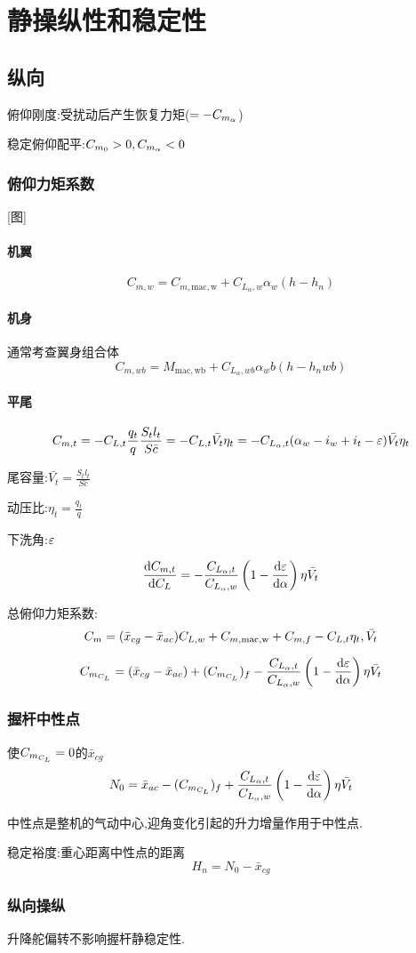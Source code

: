 \chapter{静操纵性和稳定性}

\section{纵向}
俯仰刚度:受扰动后产生恢复力矩($=-{C_{m_\alpha}}$)

稳定俯仰配平:${C_{m_0}} >0 ,{C_{m_\alpha}}<0$

\subsection{俯仰力矩系数}
[图]
\subsubsection{机翼}
$$C_{m,w}=C_{m,\mathrm{mac,w}}+C_{L_\alpha,w} \alpha_w(h-h_n)$$

\subsubsection{机身}
通常考查翼身组合体
$$C_{m,wb}=M_{\mathrm{mac,wb}}+C_{L_\alpha,wb} \alpha_wb(h-h_nwb)$$

\subsubsection{平尾}
$$C_{m,t}=-C_{L,t}\frac{q_t}{q}\frac{S_tl_t}{S\bar{c}}=-C_{L,t}\bar{V_t}\eta_t=-C_{L_{\alpha},t}(\alpha_w-i_w+i_t-{\varepsilon})\bar{V_t}\eta_t$$

尾容量:$\displaystyle\bar{V_t}=\frac{S_tl_t}{S\bar{c}}$

动压比:$\displaystyle\eta_t=\frac{q_t}{q}$

下洗角:${\varepsilon}$

$$\frac{\operatorname{d\!} C_{m,t}}{\operatorname{d\!} {C_L}}=-\frac{C_{L_\alpha,t}}{C_{L_\alpha,w}}\left(1-\frac{\operatorname{d\!} {\varepsilon}}{\operatorname{d\!} \alpha}\right)\eta\bar{V_t}$$

\nl
总俯仰力矩系数:
$${C_m}=(\bar{x}_{cg}-\bar{x}_{ac})C_{L,w}+C_{m,\mathrm{mac,w}}+C_{m,f}-C_{L,t}\eta_t,\bar{V_t}$$

$${C_{m_{C_L}}}=(\bar{x}_{cg}-\bar{x}_{ac})+({C_{m_{C_L}}})_f-\frac{C_{L_\alpha,t}}{C_{L_\alpha,w}}\left(1-\frac{\operatorname{d\!} {\varepsilon}}{\operatorname{d\!} \alpha}\right)\eta\bar{V_t}$$

\subsection{握杆中性点}
使${C_{m_{C_L}}}=0$的$\bar{x}_{cg}$
$$N_0=\bar{x}_{ac}-({C_{m_{C_L}}})_f+\frac{C_{L_\alpha,t}}{C_{L_\alpha,w}}\left(1-\frac{\operatorname{d\!} {\varepsilon}}{\operatorname{d\!} \alpha}\right)\eta\bar{V_t}$$

中性点是整机的气动中心,迎角变化引起的升力增量作用于中性点.

稳定裕度:重心距离中性点的距离
$$H_n=N_0-\bar{x}_{cg}$$

\subsection{纵向操纵}
升降舵偏转不影响握杆静稳定性.



\endinput